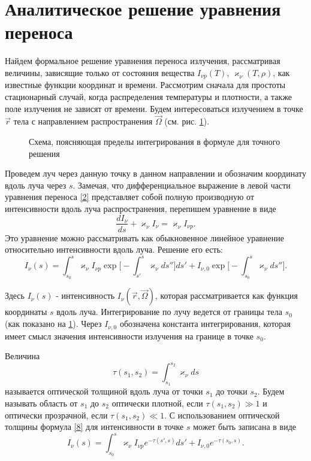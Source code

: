 \section{Аналитическое решение уравнения переноса}
Найдем формальное решение уравнения переноса излучения, рассматривая величины, зависящие только от состояния вещества $I_{\nu p}(T)$, $\varkappa_{\nu}(T, \rho)$, как известные функции координат и времени. Рассмотрим сначала для простоты стационарный случай, когда распределения температуры и плотности, а также поле излучения не зависят от времени. Будем интересоваться излучением в точке $\vec r$ тела с направлением распространения $\vec \Omega$ (см. рис. \ref{fig:2}). 
\begin{figure}[ht!]
\caption{Схема, поясняющая пределы интегрирования в формуле для точного решения}
\label{fig:2}
\end{figure}
Проведем луч через данную точку в данном направлении и обозначим координату вдоль луча через $s$. Замечая, что дифференциальное выражение в левой части уравнения переноса \eqref{2} представляет собой полную производную от интенсивности вдоль луча распространения, перепишем уравнение в виде
\begin {equation}
\frac{dI_{\nu}}{ds} + \varkappa_{\nu}I_{\nu} = \varkappa_{\nu}I_{\nu p}.
\end {equation}
Это уравнение можно рассматривать как обыкновенное линейное уравнение относительно интенсивности вдоль луча. Решение его есть:
\begin {equation}
I_{\nu}(s) = \int_{s_0}^s\varkappa_{\nu}I_{\nu p} \exp\Big[-\int_{s'}^s\varkappa_{\nu}ds''\Big]ds' + I_{\nu,0} \exp\Big[-\int_{s_0}^s \varkappa_{\nu}ds''\Big].
\label{8}
\end {equation}

Здесь $I_{\nu}(s)$ - интенсивность $I_{\nu}(\vec r, \vec\Omega)$, которая рассматривается как функция координаты $s$ вдоль луча. Интегрирование по лучу ведется от границы тела $s_0$ (как показано на \ref{fig:2}). Через $I_{\nu, 0}$ обозначена константа интегрирования, которая имеет смысл значения интенсивности излучения на границе в точке $s_0$.

Величина
\begin{equation}
\tau(s_1, s_2) = \int_{s_1}^{s_2} \varkappa_\nu ds
\end{equation}
называется оптической толщиной вдоль луча от точки $s_1$ до точки $s_2$. Будем называть область от $s_1$ до $s_2$ оптически плотной, если $\tau(s_1, s_2) \gg 1$ и оптически прозрачной, если $\tau(s_1, s_2) \ll 1$.
С использованием оптической толщины формула \eqref{8} для интенсивности в точке $s$ может быть записана в виде
\begin{equation}
I_\nu(s) = \int_{s_0}^s \varkappa_\nu I_{\nu p} e^{-\tau(s', s)} ds'
+ I_{\nu,0} e^{-\tau(s_0, s)}
.
\label{eq:8_5}
\end{equation}